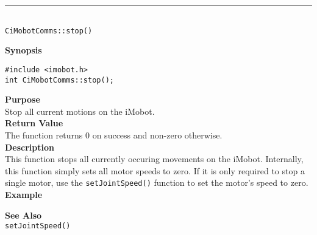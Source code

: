 \noindent
\vspace{5pt}
\rule{4.5in}{0.015in}\\
\noindent
{\LARGE \texttt{CiMobotComms::stop()}}\\
{}

\noindent
{\bf Synopsis}\\
\begin{verbatim}
#include <imobot.h>
int CiMobotComms::stop();
\end{verbatim}

\noindent
{\bf Purpose}\\
Stop all current motions on the iMobot.\\

\noindent
{\bf Return Value}\\
The function returns 0 on success and non-zero otherwise.\\

\noindent
{\bf Description}\\
This function stops all currently occuring movements on the iMobot. Internally, this function simply sets all motor speeds to zero. If it is only required to stop a single motor, use the 
\texttt{setJointSpeed()} function to set the motor's speed to zero. \\

\noindent
{\bf Example}\\
\noindent

\noindent
{\bf See Also}\\
\texttt{setJointSpeed()}

